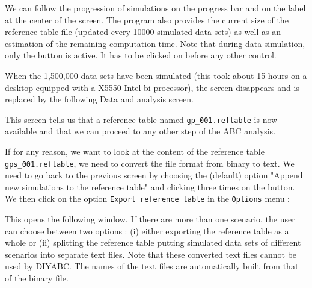 \newpage

 We can follow the progression of simulations on the progress bar and on the label at the center of the screen. The program also provides the current size of the reference table file (updated every 10000 simulated data sets) as well as an estimation of the remaining computation time. Note that during data simulation, only the  button is active. It has to be clicked on before any other control.




When the 1,500,000 data sets have been simulated (this took about 15 hours on a desktop equipped with a  X5550 Intel bi-processor), the screen disappears and is replaced by the following Data and analysis screen.




This screen tells us that a reference table named \texttt{gp\_001.reftable} is now available and that we can proceed to any other step of the ABC analysis.

\newpage

If for any reason,  we want to look at the content of the reference table \texttt{gps\_001.reftable}, we need to convert the file format from binary to text. We need to go back to the previous screen by choosing the (default) option "Append new simulations to the reference table" and clicking three times on the  \fbox{\textsf{$>>$}} button. We then click on the option \texttt{Export reference table} in the \texttt{Options} menu :


This opens the following window. If there are more than one scenario, the user can choose between two options : (i) either exporting the reference table as a whole or  (ii) splitting the reference table putting simulated data sets of different scenarios into separate text files. Note that these converted text files cannot be used by DIYABC. The names of the text files are automatically built from that of the binary file.

